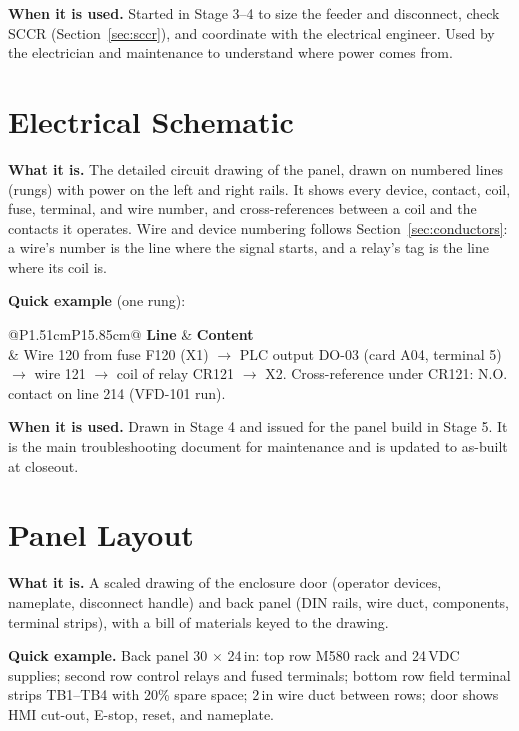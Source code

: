 \textbf{When it is used.} Started in Stage 3--4 to size the feeder and disconnect, check SCCR (Section~\ref{sec:sccr}), and coordinate with the electrical engineer. Used by the electrician and maintenance to understand where power comes from.

\section{Electrical Schematic}
\textbf{What it is.} The detailed circuit drawing of the panel, drawn on numbered lines (rungs) with power on the left and right rails. It shows every device, contact, coil, fuse, terminal, and wire number, and cross-references between a coil and the contacts it operates. Wire and device numbering follows Section~\ref{sec:conductors}: a wire's number is the line where the signal starts, and a relay's tag is the line where its coil is.

\textbf{Quick example} (one rung):
\begin{center}
\begin{tabular}{@{}P{1.51cm}P{15.85cm}@{}}
\toprule
{}\textbf{Line} & \textbf{Content} \\
 & Wire 120 from fuse F120 (X1) $\rightarrow$ PLC output DO-03 (card A04, terminal 5) $\rightarrow$ wire 121 $\rightarrow$ coil of relay CR121 $\rightarrow$ X2. Cross-reference under CR121: N.O. contact on line 214 (VFD-101 run). \\
\bottomrule
\end{tabular}
\end{center}

\textbf{When it is used.} Drawn in Stage 4 and issued for the panel build in Stage 5. It is the main troubleshooting document for maintenance and is updated to as-built at closeout.

\section{Panel Layout}
\textbf{What it is.} A scaled drawing of the enclosure door (operator devices, nameplate, disconnect handle) and back panel (DIN rails, wire duct, components, terminal strips), with a bill of materials keyed to the drawing.

\textbf{Quick example.} Back panel 30 $\times$ 24\,in: top row M580 rack and 24\,VDC supplies; second row control relays and fused terminals; bottom row field terminal strips TB1--TB4 with 20\% spare space; 2\,in wire duct between rows; door shows HMI cut-out, E-stop, reset, and nameplate.

